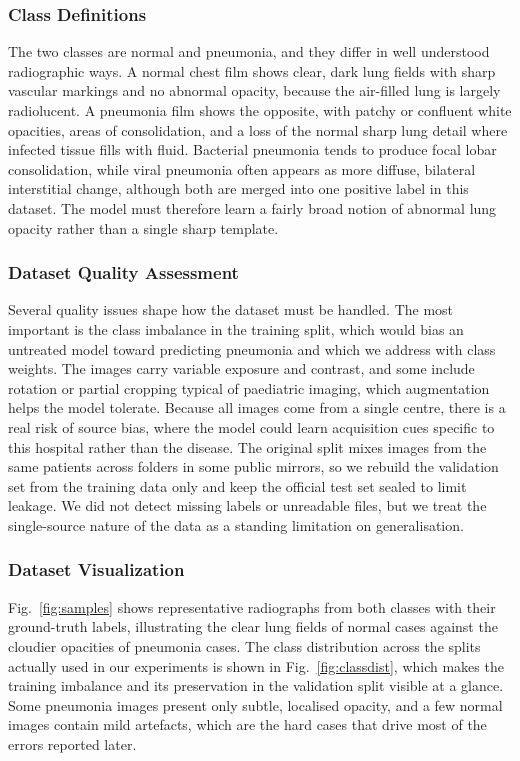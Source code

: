 \documentclass[preprint,12pt]{elsarticle}
\begin{document}
\subsubsection{Class Definitions}
The two classes are normal and pneumonia, and they differ in well understood radiographic ways.
A normal chest film shows clear, dark lung fields with sharp vascular markings and no abnormal opacity, because the air-filled lung is largely radiolucent.
A pneumonia film shows the opposite, with patchy or confluent white opacities, areas of consolidation, and a loss of the normal sharp lung detail where infected tissue fills with fluid.
Bacterial pneumonia tends to produce focal lobar consolidation, while viral pneumonia often appears as more diffuse, bilateral interstitial change, although both are merged into one positive label in this dataset.
The model must therefore learn a fairly broad notion of abnormal lung opacity rather than a single sharp template.

\subsubsection{Dataset Quality Assessment}
Several quality issues shape how the dataset must be handled.
The most important is the class imbalance in the training split, which would bias an untreated model toward predicting pneumonia and which we address with class weights.
The images carry variable exposure and contrast, and some include rotation or partial cropping typical of paediatric imaging, which augmentation helps the model tolerate.
Because all images come from a single centre, there is a real risk of source bias, where the model could learn acquisition cues specific to this hospital rather than the disease.
The original split mixes images from the same patients across folders in some public mirrors, so we rebuild the validation set from the training data only and keep the official test set sealed to limit leakage.
We did not detect missing labels or unreadable files, but we treat the single-source nature of the data as a standing limitation on generalisation.

\subsubsection{Dataset Visualization}
Fig.~\ref{fig:samples} shows representative radiographs from both classes with their ground-truth labels, illustrating the clear lung fields of normal cases against the cloudier opacities of pneumonia cases.
The class distribution across the splits actually used in our experiments is shown in Fig.~\ref{fig:classdist}, which makes the training imbalance and its preservation in the validation split visible at a glance.
Some pneumonia images present only subtle, localised opacity, and a few normal images contain mild artefacts, which are the hard cases that drive most of the errors reported later.
\end{document}
